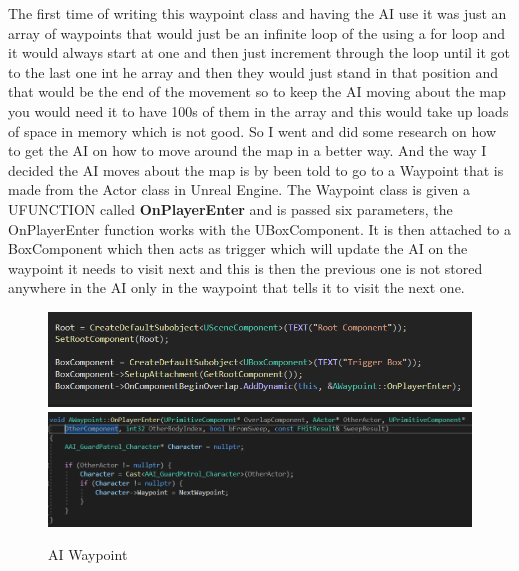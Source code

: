 The first time of writing this waypoint class and having the AI use it was just an array of waypoints that would just be an infinite loop of the using a for loop and it would always start at one and then just increment through the loop until it got to the last one int he array and then they would just stand in that position and that would be the end of the movement so to keep the AI moving about the map you would need it to have 100s of them in the array and this would take up loads of space in memory which is not good. So I went and did some research on how to get the AI on how to move around the map in a better way. And the way I decided the AI moves about the map is by been told to go to a Waypoint that is made from the Actor class in Unreal Engine. The Waypoint class is given a UFUNCTION called \textbf{OnPlayerEnter} and is passed six parameters, the OnPlayerEnter function works with the UBoxComponent. It is then attached to a BoxComponent which then acts as trigger which will update the AI on the waypoint it needs to visit next and this is then the previous one is not stored anywhere in the AI only in the waypoint that tells it to visit the next one.
\begin{figure}[H]
    \centering
    \includegraphics[scale=.5]{img/WaypointTrigger.PNG}
    \includegraphics[scale=.5]{img/PlayerEnter.PNG}
    \caption{AI Waypoint}
    \label{AI Waypoint}
\end{figure}
